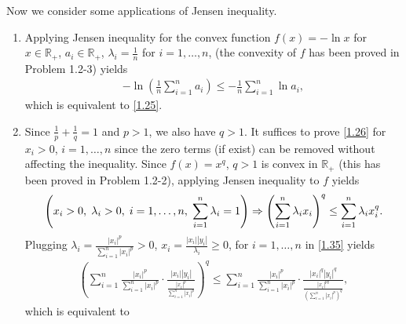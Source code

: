 \documentclass[a4paper]{article}
\numberwithin{equation}{section}
\begin{document}
Now we consider some applications of Jensen inequality.
\begin{enumerate}
\item Applying Jensen inequality for the convex function $f\left(x\right) =-\ln x$ for $x\in \mathbb{R}_+$, $a_i \in \mathbb{R}_+$, $\lambda _i=\frac{1}{n}$ for $i=1,\ldots,n$, (the convexity of $f$ has been proved in Problem 1.2-3) yields
\begin{align}
- \ln \left( {\frac{1}{n}\sum\limits_{i = 1}^n {{a_i}} } \right) \le  - \frac{1}{n}\sum\limits_{i = 1}^n {\ln {a_i}} ,
\end{align}
which is equivalent to \eqref{1.25}. 
\item Since $\frac{1}{p}+\frac{1}{q}=1$ and $p>1$, we also have $q>1$. It suffices to prove \eqref{1.26} for $x_i >0$, $i=1,\ldots,n$ since the zero terms (if exist) can be removed without affecting the inequality. Since $f\left(x\right)=x^q$, $q>1$ is convex in $\mathbb{R}_+$ (this has been proved in Problem 1.2-2), applying Jensen inequality to $f$ yields
\begin{align}
\label{1.35}
\left( {{x_i} > 0,\hspace{0.1cm} {\lambda _i} > 0,\hspace{0.1cm} i = 1, \ldots ,n,\hspace{0.1cm}\sum\limits_{i = 1}^n {{\lambda _i}}  = 1} \right) \Rightarrow {\left( {\sum\limits_{i = 1}^n {{\lambda _i}{x_i}} } \right)^q} \le \sum\limits_{i = 1}^n {{\lambda _i}x_i^q} .
\end{align}
Plugging ${\lambda _i} = \frac{{{{\left| {{x_i}} \right|}^p}}}{{\sum\nolimits_{i = 1}^n {{{\left| {{x_i}} \right|}^p}} }} >0$, $ {x_i} = \frac{{\left| {{x_i}} \right|\left| {{y_i}} \right|}}{{{\lambda _i}}} \ge 0$, for $i=1,\ldots,n$ in \eqref{1.35} yields
\begin{align}
{\left( {\sum\limits_{i = 1}^n {\frac{{{{\left| {{x_i}} \right|}^p}}}{{\sum\limits_{i = 1}^n {{{\left| {{x_i}} \right|}^p}} }} \cdot \frac{{\left| {{x_i}} \right|\left| {{y_i}} \right|}}{{\frac{{{{\left| {{x_i}} \right|}^p}}}{{\sum\limits_{i = 1}^n {{{\left| {{x_i}} \right|}^p}} }}}}} } \right)^q} \le \sum\limits_{i = 1}^n {\frac{{{{\left| {{x_i}} \right|}^p}}}{{\sum\nolimits_{i = 1}^n {{{\left| {{x_i}} \right|}^p}} }} \cdot \frac{{{{\left| {{x_i}} \right|}^q}{{\left| {{y_i}} \right|}^q}}}{{\frac{{{{\left| {{x_i}} \right|}^{pq}}}}{{{{\left( {\sum\limits_{i = 1}^n {{{\left| {{x_i}} \right|}^p}} } \right)}^q}}}}}} ,
\end{align}
which is equivalent to
\begin{align}

\end{align}
\end{enumerate}
\end{document}

